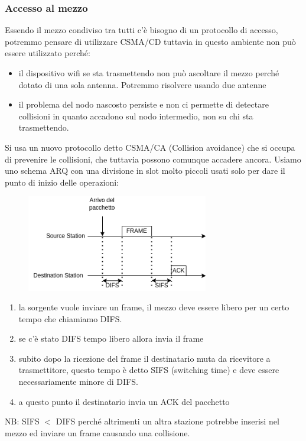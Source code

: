 \subsubsection{Accesso al mezzo}
Essendo il mezzo condiviso tra tutti c'è bisogno di un protocollo di accesso, potremmo pensare di utilizzare CSMA/CD tuttavia in questo ambiente non può essere utilizzato perché:
\begin{itemize}
    \item il dispositivo wifi se sta trasmettendo non può ascoltare il mezzo perché dotato di una sola antenna. Potremmo risolvere usando due antenne

    \item il problema del nodo nascosto persiste e non ci permette di detectare collisioni in quanto accadono sul nodo intermedio, non su chi sta trasmettendo.
\end{itemize}

Si usa un nuovo protocollo detto CSMA/CA (Collision avoidance) che si occupa di prevenire le collisioni, che tuttavia possono comunque accadere ancora.
Usiamo uno schema ARQ con una divisione in slot molto piccoli usati solo per dare il punto di inizio delle operazioni:
\begin{figure}[H]
    \centering
    \includegraphics[width=300px]{images/8_Wireless_Mobile/802.11_comunication.png}
\end{figure}
\begin{enumerate}
    \item la sorgente vuole inviare un frame, il mezzo deve essere libero per un certo tempo che chiamiamo DIFS.

    \item se c'è stato DIFS tempo libero allora invia il frame

    \item subito dopo la ricezione del frame il destinatario muta da ricevitore a trasmettitore, questo tempo è detto SIFS (switching time) e deve essere necessariamente minore di DIFS.

    \item a questo punto il destinatario invia un ACK del pacchetto
\end{enumerate}
NB: SIFS $<$ DIFS perché altrimenti un altra stazione potrebbe inserisi nel mezzo ed inviare un frame causando una collisione.

